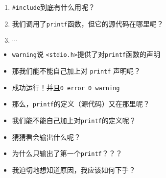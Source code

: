 \documentclass{ctexbeamer} %
\begin{document}
\begin{frame}[fragile]
	
	\pause
	\begin{enumerate}
		\item \texttt{\#include}到底有什么用呢？
		\item 我们调用了\texttt{printf}函数，但它的源代码在哪里呢？
		\item $\cdots$
	\end{enumerate}
\end{frame}

\begin{frame}[fragile]
	

	
	
	\begin{itemize}
		\item \texttt{warning}说 \texttt{<stdio.h>}提供了对\texttt{printf}函数的声明
		\item 那我们能不能自己加上对 \texttt{printf} 声明呢？
	\end{itemize}
\end{frame}

\begin{frame}[fragile]
	

	\begin{itemize}
		\item 成功运行！并且\texttt{0 error 0 warning}
		\item 那么，\texttt{printf}的定义（源代码）又在那里呢？
		\item 我们能不能自己加上对\texttt{printf}的定义呢？
	\end{itemize}
\end{frame}

\begin{frame}[fragile]
	

	\begin{itemize}
		\item 猜猜看会输出什么呢？\pause
		\item 为什么只输出了第一个\texttt{printf}？？？
		\item 我迫切地想知道原因，我应该如何下手？
	\end{itemize}
\end{frame}
\end{document}
